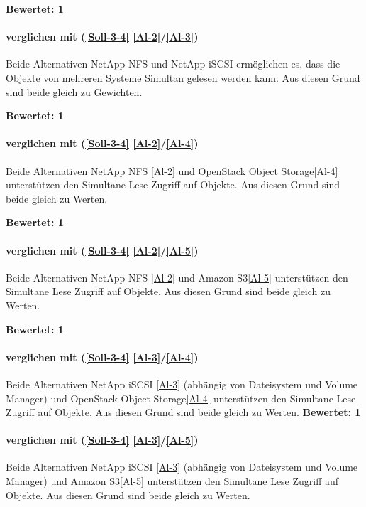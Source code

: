 \textbf{Bewertet: 1}

\paragraph*{  verglichen mit  (\ref{Soll-3-4} \ref{Al-2}/\ref{Al-3})}
Beide Alternativen NetApp NFS  und NetApp iSCSI  ermöglichen es, dass die Objekte von mehreren Systeme Simultan gelesen werden kann. Aus diesen Grund sind beide gleich zu Gewichten.

\textbf{Bewertet: 1}

\paragraph*{  verglichen mit  (\ref{Soll-3-4} \ref{Al-2}/\ref{Al-4})}
Beide Alternativen NetApp NFS \ref{Al-2} und OpenStack Object Storage\ref{Al-4} unterstützen den Simultane Lese Zugriff auf Objekte. Aus diesen Grund sind beide gleich zu Werten.

\textbf{Bewertet: 1}

\paragraph*{  verglichen mit  (\ref{Soll-3-4} \ref{Al-2}/\ref{Al-5})}
Beide Alternativen NetApp NFS \ref{Al-2} und Amazon S3\ref{Al-5} unterstützen den Simultane Lese Zugriff auf Objekte. Aus diesen Grund sind beide gleich zu Werten.

\textbf{Bewertet: 1}

\paragraph*{  verglichen mit  (\ref{Soll-3-4} \ref{Al-3}/\ref{Al-4})}
Beide Alternativen NetApp iSCSI \ref{Al-3} (abhängig von Dateisystem und Volume Manager) und OpenStack Object Storage\ref{Al-4} unterstützen den Simultane Lese Zugriff auf Objekte. Aus diesen Grund sind beide gleich zu Werten.
\textbf{Bewertet: 1}

\paragraph*{  verglichen mit  (\ref{Soll-3-4} \ref{Al-3}/\ref{Al-5})}
Beide Alternativen NetApp iSCSI \ref{Al-3} (abhängig von Dateisystem und Volume Manager) und Amazon S3\ref{Al-5} unterstützen den Simultane Lese Zugriff auf Objekte. Aus diesen Grund sind beide gleich zu Werten.

